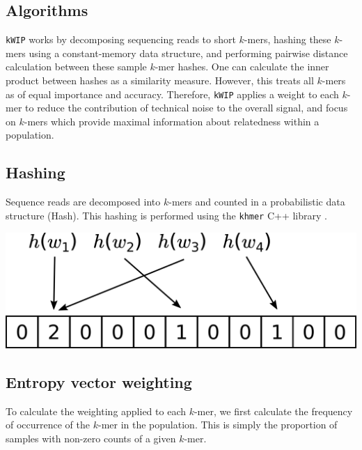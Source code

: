 \documentclass[a0,portrait]{a0poster}
\begin{document}
\begin{multicols}{2}
\section*{Algorithms}

\texttt{kWIP} works by decomposing sequencing reads to short $k$-mers, hashing
these $k$-mers using a constant-memory data structure, and performing pairwise
distance calculation between these sample $k$-mer hashes. One can calculate
the inner product between hashes as a similarity measure. However, this treats
all $k$-mers as of equal importance and accuracy. Therefore, \texttt{kWIP}
applies a weight to each $k$-mer to reduce the contribution of technical noise
to the overall signal, and focus on $k$-mers which provide maximal information
about relatedness within a population.


\subsection*{Hashing}

Sequence reads are decomposed into $k$-mers and counted in a probabilistic
data structure (Hash). This hashing is performed using the \texttt{khmer} C++
library \cite{crusoe_khmer_2015}.

\begin{center}
  \vspace{1cm}
  \includegraphics[width=20cm]{hashing.png}
  \vspace{1cm}
\end{center}

\subsection*{Entropy vector weighting}

To calculate the weighting applied to each $k$-mer, we first calculate the
frequency of occurrence of the $k$-mer in the population. This is simply the
proportion of samples with non-zero counts of a given $k$-mer.


\end{multicols}
\end{document}
